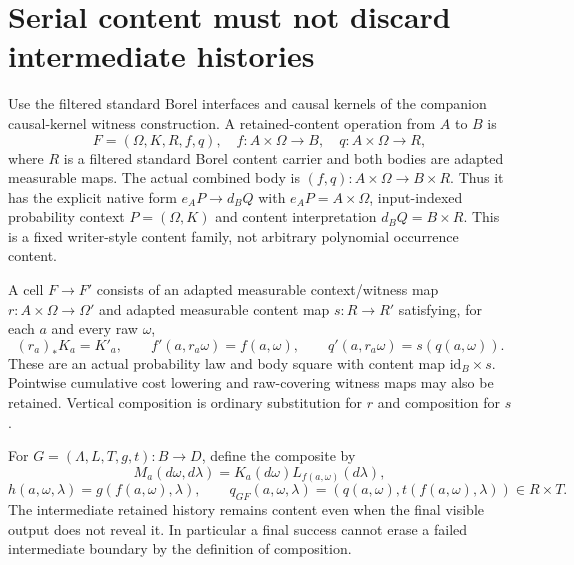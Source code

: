 \documentclass[11pt]{article}
\begin{document}
\section{Serial content must not discard intermediate histories}
Use the filtered standard Borel interfaces and causal kernels of the companion causal-kernel witness construction. A retained-content operation from $A$ to $B$ is
\[
 F=(\Omega,K,R,f,q),\quad f:A\times\Omega\to B,\quad q:A\times\Omega\to R,
\]
where $R$ is a filtered standard Borel content carrier and both bodies are adapted measurable maps. The actual combined body is $(f,q):A\times\Omega\to B\times R$. Thus it has the explicit native form $e_A P\to d_B Q$ with $e_A P=A\times\Omega$, input-indexed probability context $P=(\Omega,K)$ and content interpretation $d_BQ=B\times R$. This is a fixed writer-style content family, not arbitrary polynomial occurrence content.

A cell $F\to F'$ consists of an adapted measurable context/witness map $r:A\times\Omega\to\Omega'$ and adapted measurable content map $s:R\to R'$ satisfying, for each $a$ and every raw $\omega$,
\[
 (r_a)_*K_a=K'_a,\qquad f'(a,r_a\omega)=f(a,\omega),\qquad
 q'(a,r_a\omega)=s(q(a,\omega)).
\]
These are an actual probability law and body square with content map $\mathrm{id}_B\times s$. Pointwise cumulative cost lowering and raw-covering witness maps may also be retained. Vertical composition is ordinary substitution for $r$ and composition for $s$.

For $G=(\Lambda,L,T,g,t):B\to D$, define the composite by
\[
 M_a(d\omega,d\lambda)=K_a(d\omega)L_{f(a,\omega)}(d\lambda),
\]
\[
 h(a,\omega,\lambda)=g(f(a,\omega),\lambda),\qquad
 q_{GF}(a,\omega,\lambda)=(q(a,\omega),t(f(a,\omega),\lambda))\in R\times T.
\]
The intermediate retained history remains content even when the final visible output does not reveal it. In particular a final success cannot erase a failed intermediate boundary by the definition of composition.
\end{document}
